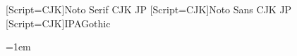     \newfontfamily{\cjkfont}[Script=CJK]{Noto Serif CJK JP}
    \newfontfamily{\cjkfontsf}[Script=CJK]{Noto Sans CJK JP}
    \newfontfamily{\cjkfonttt}[Script=CJK]{IPAGothic}

    \newdimen\zw
    \zw=1em
    \newcommand{\kintou}[2]{%
      \leavevmode\hbox to#1{\begingroup
        \xeCJKsetup{CJKglue=\hfill}#2%
      \endgroup}%
    }
    \newcommand{\kenten}[1]{\CJKunderdot[depth=-0.9em]{#1}}
    \newcommand{\AttischXeRuby}[2]{%
      \begingroup
        \let\textgerman\@firstofone
        \jruby[g]{#1}{#2}%
      \endgroup
    }
    \AtBeginDocument{\let\ruby\AttischXeRuby}

    \def\cleartooddpage{\clearpage\if@twoside
      \ifodd\c@page\else
      \hbox{}\thispagestyle{empty}\newpage
      \if@twocolumn\hbox{}\newpage\fi
      \fi\fi}
    \def\cleartoevenpage{\clearpage\if@twoside
      \ifodd\c@page
      \hbox{}\thispagestyle{empty}\newpage
      \if@twocolumn\hbox{}\newpage\fi
      \fi\fi}
  \else
    \usepackage{pxjahyper}
  \fi
\fi

\newcommand*{\germanlanguagename}{german}
\newcommand*{\greeklanguagename}{greek}
\newcommand*{\ifsperrsatzlanguage}[2]{%
\ifboolexpr{%
  test {\ifdefstrequal{\languagename}{\germanlanguagename}}
   or
  test {\ifcsstrequal{\languagename}{\germanlanguagename}}
  or
  test {\ifdefstrequal{\languagename}{\greeklanguagename}}
  or
  test {\ifcsstrequal{\languagename}{\greeklanguagename}}
}{#1}{#2}%
}
\ifdefined\newfontfamily
  \newfontfamily{}
  \ifFraktur

